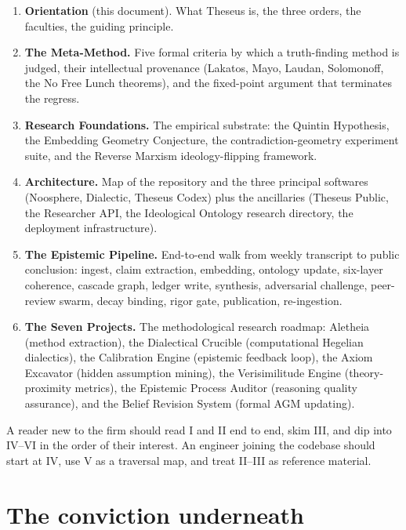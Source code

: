 \documentclass[11pt,letterpaper]{article}
\begin{document}
\begin{enumerate}[leftmargin=1.5em,itemsep=0.2em]
\item[\textbf{I.}]  \textbf{Orientation} (this document). What Theseus is, the three orders, the faculties, the guiding principle.
\item[\textbf{II.}]  \textbf{The Meta-Method.} Five formal criteria by which a truth-finding method is judged, their intellectual provenance (Lakatos, Mayo, Laudan, Solomonoff, the No Free Lunch theorems), and the fixed-point argument that terminates the regress.
\item[\textbf{III.}]  \textbf{Research Foundations.} The empirical substrate: the Quintin Hypothesis, the Embedding Geometry Conjecture, the contradiction-geometry experiment suite, and the Reverse Marxism ideology-flipping framework.
\item[\textbf{IV.}]  \textbf{Architecture.} Map of the repository and the three principal softwares (Noosphere, Dialectic, Theseus Codex) plus the ancillaries (Theseus Public, the Researcher API, the Ideological Ontology research directory, the deployment infrastructure).
\item[\textbf{V.}]  \textbf{The Epistemic Pipeline.} End-to-end walk from weekly transcript to public conclusion: ingest, claim extraction, embedding, ontology update, six-layer coherence, cascade graph, ledger write, synthesis, adversarial challenge, peer-review swarm, decay binding, rigor gate, publication, re-ingestion.
\item[\textbf{VI.}]  \textbf{The Seven Projects.} The methodological research roadmap: Aletheia (method extraction), the Dialectical Crucible (computational Hegelian dialectics), the Calibration Engine (epistemic feedback loop), the Axiom Excavator (hidden assumption mining), the Verisimilitude Engine (theory-proximity metrics), the Epistemic Process Auditor (reasoning quality assurance), and the Belief Revision System (formal AGM updating).
\end{enumerate}

A reader new to the firm should read I and II end to end, skim III, and dip into IV--VI in the order of their interest. An engineer joining the codebase should start at IV, use V as a traversal map, and treat II--III as reference material.

\section{The conviction underneath}
\end{document}
